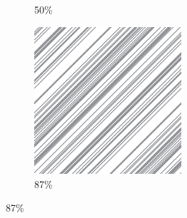 \documentclass[12pt, fleqn]{report}                             %
\theoremstyle{break}                                            %
\begin{document}
\begin{figure}[ht!]
\begin{subfigure}[b]{0.4\linewidth}
          \caption{50\%}
        \end{subfigure}
        \begin{subfigure}[b]{0.4\linewidth}
          \includegraphics[width=0.6\textwidth]{Images/142/d.png}
          \caption{87\%}
        \end{subfigure}
      \end{figure}
\end{document}
